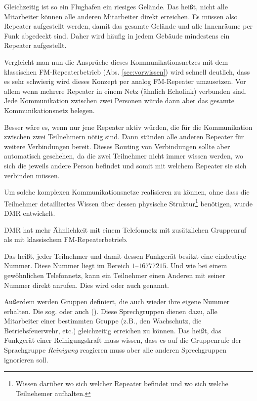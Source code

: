 Gleichzeitig ist so ein Flughafen ein riesiges Gelände. Das heißt, nicht alle Mitarbeiter können alle anderen Mitarbeiter direkt erreichen. Es müssen also Repeater aufgestellt werden, damit das gesamte Gelände und alle Innenräume per Funk abgedeckt sind. Daher wird häufig in jedem Gebäude mindestens ein Repeater aufgestellt. 

Vergleicht man nun die Ansprüche dieses Kommunikationsnetzes mit dem klassischen FM-Repeaterbetrieb (Abs. \ref{sec:vorwissen}) wird schnell deutlich, dass es sehr schwierig wird dieses Konzept per analog FM-Repeater umzusetzen. Vor allem wenn mehrere Repeater in einem Netz (ähnlich Echolink) verbunden sind. Jede Kommunikation zwischen zwei Personen würde dann aber das gesamte Kommunikationsnetz belegen. 

Besser wäre es, wenn nur jene Repeater aktiv würden, die für die Kommunikation zwischen zwei Teilnehmern nötig sind. Dann stünden alle anderen Repeater für weitere Verbindungen bereit. Dieses Routing von Verbindungen sollte aber automatisch geschehen, da die zwei Teilnehmer nicht immer wissen werden, wo sich die jeweils andere Person befindet und somit mit welchem Repeater sie sich verbinden müssen. 

Um solche komplexen Kommunikationsnetze realisieren zu können, ohne dass die Teilnehmer detailliertes Wissen über dessen physische Struktur\footnote{Wissen darüber wo sich welcher Repeater befindet und wo sich welche Teilnehemer aufhalten.} benötigen, wurde DMR entwickelt.

\begin{merke}
 DMR hat mehr Ähnlichkeit mit einem Telefonnetz mit zusätzlichen Gruppenruf als mit klassischem FM-Repeaterbetrieb.
\end{merke} 

Das heißt, jeder Teilnehmer und damit dessen Funkgerät besitzt eine eindeutige Nummer. Diese Nummer liegt im Bereich $1$--$16777215$. Und wie bei einem gewöhnlichen Telefonnetz, kann ein Teilnehmer einen Anderen mit seiner Nummer direkt anrufen. Dies wird  oder auch  genannt.

Außerdem werden Gruppen definiert, die auch wieder ihre eigene Nummer erhalten. Die sog.  oder auch  (). Diese Sprechgruppen dienen dazu, alle Mitarbeiter einer bestimmten Gruppe (z.B., den Wachschutz, die Betriebsfeuerwehr, etc.) gleichzeitig erreichen zu können. Das heißt, das Funkgerät einer Reinigungskraft muss wissen, dass es auf die Gruppenrufe der Sprachgruppe \emph{Reinigung} reagieren muss aber alle anderen Sprechgruppen ignorieren soll. 

